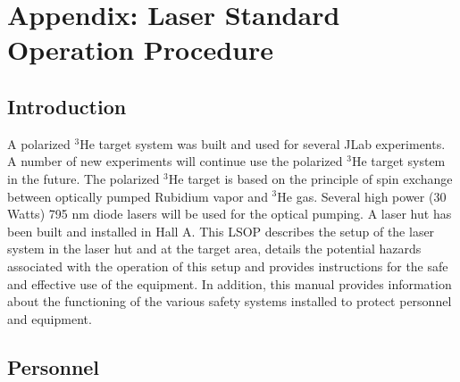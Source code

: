 \section{Appendix: Laser Standard Operation Procedure}
\label{sec:lsop}

\subsection{ Introduction}

A polarized $^3$He target system was built and used for several 
JLab experiments. A number of new experiments will continue use the 
polarized $^3$He target system in the future. 
The polarized $^3$He target is based on 
the principle of spin exchange between optically pumped Rubidium vapor and 
$^3$He gas. Several high power (30 Watts) 795 nm diode lasers will be used 
for the optical pumping. A laser hut has been built and installed in Hall A.
This LSOP describes the setup of the 
laser system in the laser hut and at the target area, 
details the potential
hazards associated with the operation of this setup and provides instructions
for the safe and effective use of the equipment. In addition,
this manual provides information about the functioning of the various safety 
systems installed to protect personnel and equipment.

\subsection{Personnel}

